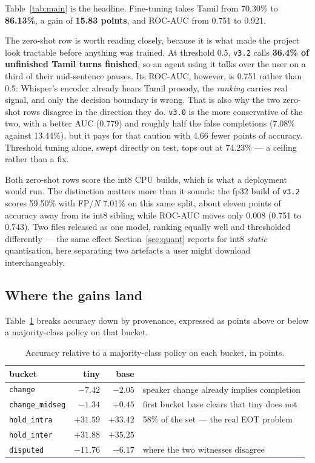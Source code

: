 \documentclass[11pt]{article}
\newcommand{\pct}{\%}
\begin{document}
Table~\ref{tab:main} is the headline. Fine-tuning takes Tamil from
70.30\pct{} to \textbf{86.13\pct}, a gain of \textbf{15.83 points}, and ROC-AUC
from 0.751 to 0.921.

The zero-shot row is worth reading closely, because it is what made the project
look tractable before anything was trained. At threshold 0.5, \texttt{v3.2}
calls \textbf{36.4\pct{} of unfinished Tamil turns finished}, so an agent using
it talks over the user on a third of their mid-sentence pauses. Its ROC-AUC,
however, is 0.751 rather than 0.5: Whisper's encoder already hears Tamil
prosody, the \emph{ranking} carries real signal, and only the decision boundary
is wrong. That is also why the two zero-shot rows disagree in the direction they
do. \texttt{v3.0} is the more conservative of the two, with a better AUC (0.779)
and roughly half the false completions (7.08\pct{} against 13.44\pct{}), but it
pays for that caution with 4.66 fewer points of accuracy. Threshold tuning alone, swept directly on test, tops
out at 74.23\pct{} --- a ceiling rather than a fix.

Both zero-shot rows score the int8 CPU builds, which is what a deployment would
run. The distinction matters more than it sounds: the fp32 build of
\texttt{v3.2} scores 59.50\pct{} with FP/$N$ 7.01\pct{} on this same split, about
eleven points of accuracy away from its int8 sibling while ROC-AUC moves only
0.008 (0.751 to 0.743). Two files released as one model, ranking equally well and
thresholded differently --- the same effect Section~\ref{sec:quant} reports for
int8 \emph{static} quantisation, here separating two
artefacts a user might download interchangeably.

\subsection{Where the gains land}

Table~\ref{tab:buckets} breaks accuracy down by provenance, expressed as points
above or below a majority-class policy on that bucket.

\begin{table}[h]
\centering\small
\begin{tabular}{lrrl}
\toprule
bucket & tiny & base & \\
\midrule
\texttt{change} & $-7.42$ & $-2.05$ & speaker change already implies completion \\
\texttt{change\_midseg} & $-1.34$ & $\mathbf{+0.45}$ & first bucket base clears that tiny does not \\
\texttt{hold\_intra} & $+31.59$ & $\mathbf{+33.42}$ & 58\pct{} of the set --- the real EOT problem \\
\texttt{hold\_inter} & $+31.88$ & $\mathbf{+35.25}$ & \\
\texttt{disputed} & $-11.76$ & $-6.17$ & where the two witnesses disagree \\
\bottomrule
\end{tabular}
\caption{Accuracy relative to a majority-class policy on each bucket, in points.}
\label{tab:buckets}
\end{table}
\end{document}
